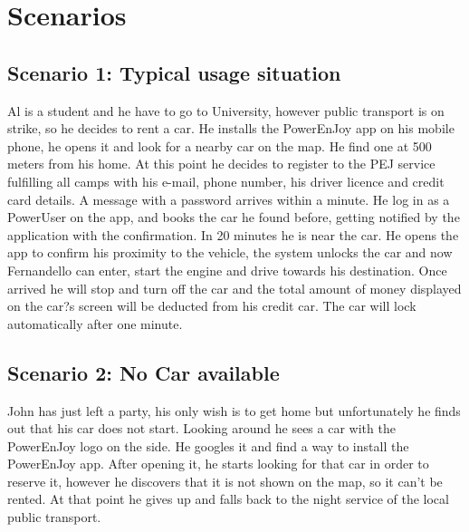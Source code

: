 \section{Scenarios}

\subsection{Scenario 1: Typical usage situation}
Al is a student and he have to go to University, however public transport is on strike, so he decides to rent a car.  He installs the PowerEnJoy app on his mobile phone, he opens it and look for a nearby car on the map. He find one at 500 meters from his home. At this point he decides to register to the PEJ service fulfilling all camps with his e-mail, phone number, his driver licence and credit card details. A message with a password arrives within a minute. He log in as a PowerUser on the app, and books the car he found before, getting notified by the application with the confirmation. In 20 minutes he is near the car. He opens the app to confirm his proximity to the vehicle, the system unlocks the car and now Fernandello can enter, start the engine and drive towards his destination. Once arrived he will stop and turn off the car and the total amount of money displayed on the car?s screen will be deducted from his credit car. The car will lock automatically after one minute. 

\subsection{Scenario 2: No Car available}
John has just left a party, his only wish is to get home but unfortunately he finds out that his car does not start. Looking around he sees a car with the PowerEnJoy logo on the side. He googles it and find a way to install the PowerEnJoy app. After opening it, he starts looking for that car in order to reserve it, however he discovers that it is not shown on the map, so it can't be rented. At that point he gives up and falls back to the night service of the local public transport.

